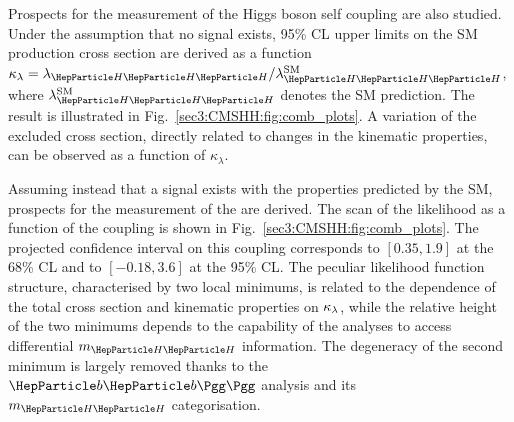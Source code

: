 
Prospects for the measurement of the Higgs boson self coupling are also studied.
Under the assumption that no \HH signal exists, 95\% CL upper limits on the SM \HH production cross section are derived as a function $\kappa_\lambda = \lambdahhh/\lambdahhh^\text{SM}$, where $\lambdahhh^\text{SM}$ denotes the SM prediction. 
The result is illustrated in Fig.~\ref{sec3:CMSHH:fig:comb_plots}.
A variation of the excluded cross section, directly related to changes in the \HH kinematic properties, can be observed as a function of $\kappa_\lambda$.


Assuming instead that a \HH signal exists with the properties predicted by the SM, prospects for the measurement of the \lambdahhh are derived.
The scan of the likelihood as a function of the \kapl coupling is shown in Fig.~\ref{sec3:CMSHH:fig:comb_plots}.
The projected confidence interval on this coupling corresponds to $[0.35, 1.9]$ at the 68\% CL and to $[-0.18, 3.6]$ at the 95\% CL.
The peculiar likelihood function structure, characterised by two local minimums, is related to the dependence of the total cross section and \HH kinematic properties on $\kappa_\lambda$, while the relative height of the two minimums depends to the capability of the analyses to access differential $m_{\HH}$ information.
The degeneracy of the second minimum is largely removed thanks to the $\bbgg$ analysis and its $m_{\HH}$ categorisation.



